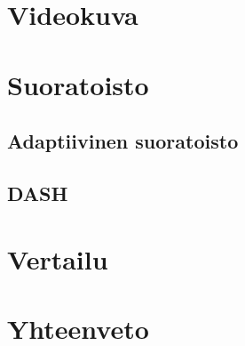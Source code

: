 \documentclass[finnish, 12pt, a4paper, elec, utf8, a-1b, online]{aaltothesis}
\begin{document}
\clearpage

\section{Videokuva}



\clearpage


\section{Suoratoisto}


\subsection*{Adaptiivinen suoratoisto}


\subsection*{DASH}


\clearpage


\section{Vertailu}


\clearpage

\section{Yhteenveto}


\clearpage
\end{document}
